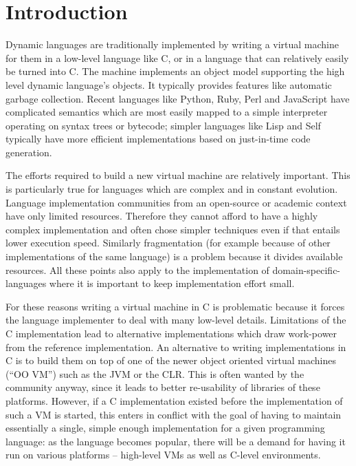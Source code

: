 \documentclass[utf8x]{llncs}
\begin{document}
\section{Introduction}

Dynamic languages are traditionally implemented by writing a virtual
machine for them in a low-level language like C, or in a language that
can relatively easily be turned into C.  The machine implements an
object model supporting the high level dynamic language's objects.  It
typically provides features like automatic garbage collection.  Recent
languages like Python, Ruby, Perl and JavaScript have complicated
semantics which are most easily mapped to a simple interpreter operating
on syntax trees or bytecode; simpler languages like Lisp and Self
typically have more efficient implementations based on just-in-time code
generation.

The efforts required to build a new virtual machine are relatively
important.  This is particularly true for languages which are complex
and in constant evolution. Language implementation communities from an
open-source or academic context have only limited resources. Therefore they
cannot afford to have a highly complex implementation and often chose simpler
techniques even if that entails lower execution speed. Similarly fragmentation
(for example because of other implementations of the same language) is a
problem because it divides available resources. All these points also apply to
the implementation of domain-specific-languages where it is important to keep
implementation effort small.

For these reasons writing a virtual machine in C is problematic because it
forces the language implementer to deal with many low-level details. Limitations
of the C implementation lead to alternative implementations which draw
work-power from the reference implementation. An alternative to writing
implementations in C is to build them on top of one of the newer object oriented
virtual machines (``OO VM'') such as the JVM or the CLR. This is often wanted by
the community anyway, since it leads to better re-usability of libraries of
these platforms. However, if a C implementation existed before the
implementation of such a VM is started, this enters in conflict with the goal of
having to maintain essentially a single, simple enough implementation for a
given programming language: as the language becomes popular, there will be a
demand for having it run on various platforms -- high-level VMs as well as
C-level environments.
\end{document}
